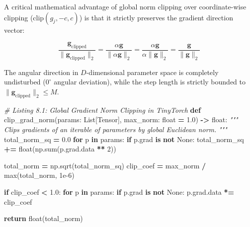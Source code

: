 \documentclass[
  letterpaper,
]{scrbook}
\newenvironment{Shaded}{\begin{snugshade}}{\end{snugshade}}
\newcommand{\BuiltInTok}[1]{#1}
\newcommand{\CommentTok}[1]{\textcolor[rgb]{0.56,0.35,0.01}{\textit{#1}}}
\newcommand{\ControlFlowTok}[1]{\textcolor[rgb]{0.13,0.29,0.53}{\textbf{#1}}}
\newcommand{\DecValTok}[1]{\textcolor[rgb]{0.00,0.00,0.81}{#1}}
\newcommand{\FloatTok}[1]{\textcolor[rgb]{0.00,0.00,0.81}{#1}}
\newcommand{\KeywordTok}[1]{\textcolor[rgb]{0.13,0.29,0.53}{\textbf{#1}}}
\newcommand{\NormalTok}[1]{#1}
\newcommand{\OperatorTok}[1]{\textcolor[rgb]{0.81,0.36,0.00}{\textbf{#1}}}
\newcommand{\VariableTok}[1]{\textcolor[rgb]{0.00,0.00,0.00}{#1}}
\begin{document}
A critical mathematical advantage of global norm clipping over
coordinate-wise clipping (\(\text{clip}(g_j, -c, c)\)) is that it
strictly preserves the gradient direction vector:

\[\frac{\mathbf{g}_{\text{clipped}}}{\|\mathbf{g}_{\text{clipped}}\|_2} = \frac{\alpha \mathbf{g}}{\|\alpha \mathbf{g}\|_2} = \frac{\alpha \mathbf{g}}{\alpha \|\mathbf{g}\|_2} = \frac{\mathbf{g}}{\|\mathbf{g}\|_2}\]

The angular direction in \(D\)-dimensional parameter space is completely
undisturbed (\(0^\circ\) angular deviation), while the step length is
strictly bounded to \(\|\mathbf{g}_{\text{clipped}}\|_2 \le M\).

\begin{Shaded}
\begin{Highlighting}[]
\CommentTok{\# Listing 8.1: Global Gradient Norm Clipping in TinyTorch}
\KeywordTok{def}\NormalTok{ clip\_grad\_norm(params: List[Tensor], max\_norm: }\BuiltInTok{float} \OperatorTok{=} \FloatTok{1.0}\NormalTok{) }\OperatorTok{{-}\textgreater{}} \BuiltInTok{float}\NormalTok{:}
    \CommentTok{"""}
\CommentTok{    Clips gradients of an iterable of parameters by global Euclidean norm.}
\CommentTok{    """}
\NormalTok{    total\_norm\_sq }\OperatorTok{=} \FloatTok{0.0}
    \ControlFlowTok{for}\NormalTok{ p }\KeywordTok{in}\NormalTok{ params:}
        \ControlFlowTok{if}\NormalTok{ p.grad }\KeywordTok{is} \KeywordTok{not} \VariableTok{None}\NormalTok{:}
\NormalTok{            total\_norm\_sq }\OperatorTok{+=} \BuiltInTok{float}\NormalTok{(np.}\BuiltInTok{sum}\NormalTok{(p.grad.data }\OperatorTok{**} \DecValTok{2}\NormalTok{))}

\NormalTok{    total\_norm }\OperatorTok{=}\NormalTok{ np.sqrt(total\_norm\_sq)}
\NormalTok{    clip\_coef }\OperatorTok{=}\NormalTok{ max\_norm }\OperatorTok{/} \BuiltInTok{max}\NormalTok{(total\_norm, }\FloatTok{1e{-}6}\NormalTok{)}

    \ControlFlowTok{if}\NormalTok{ clip\_coef }\OperatorTok{\textless{}} \FloatTok{1.0}\NormalTok{:}
        \ControlFlowTok{for}\NormalTok{ p }\KeywordTok{in}\NormalTok{ params:}
            \ControlFlowTok{if}\NormalTok{ p.grad }\KeywordTok{is} \KeywordTok{not} \VariableTok{None}\NormalTok{:}
\NormalTok{                p.grad.data }\OperatorTok{*=}\NormalTok{ clip\_coef}

    \ControlFlowTok{return} \BuiltInTok{float}\NormalTok{(total\_norm)}
\end{Highlighting}
\end{Shaded}
\end{document}
